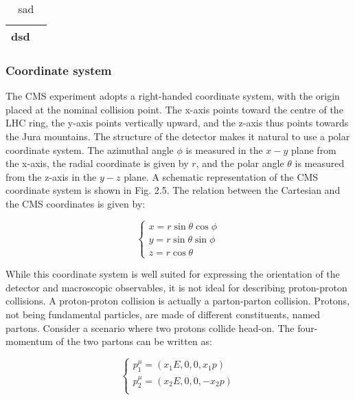 \documentclass[11pt]{article}
\begin{document}
\begin{table}[htbp]
\centering
\begin{tabular}{ll}
dsd & \\[0pt]
\hline
\end{tabular}
\caption{\label{tab_sad2}sad}

\end{table}
\subsubsection{Coordinate system}
\label{sec:org7ff022b}
The CMS experiment adopts a right-handed coordinate system, with the origin placed at the nominal collision point.
The x-axis points toward the centre of the LHC ring, the y-axis points vertically upward, and the z-axis thus points towards the Jura mountains.
The structure of the detector makes it natural to use a polar coordinate system.
The azimuthal angle \(\phi\) is measured in the \(x - y\) plane from the x-axis, the radial coordinate is given by \(r\), and the polar angle \(\theta\) is measured from the z-axis in the \(y - z\) plane.
A schematic representation of the CMS coordinate system is shown in Fig. 2.5.
The relation between the Cartesian and the CMS coordinates is given by:

\begin{equation}
\label{eq:xyzcoords}
\begin{cases}
x = r \sin \theta \cos \phi \\
y = r \sin \theta \sin \phi \\
z = r \cos \theta
\end{cases}
\end{equation}

While this coordinate system is well suited for expressing the orientation of the detector and macroscopic observables, it is not ideal for describing proton-proton collisions.
A proton-proton collision is actually a parton-parton collision.
Protons, not being fundamental particles, are made of different constituents, named partons.
Consider a scenario where two protons collide head-on.
The four-momentum of the two partons can be written as:

\begin{equation}
\label{eq:momenta}
\begin{cases}
p^{\mu}_1 = (x_1E, 0, 0, x_1p) \\
p^{\mu}_2 = (x_2E, 0, 0, -x_2p) \\
\end{cases}
\end{equation}
\end{document}
